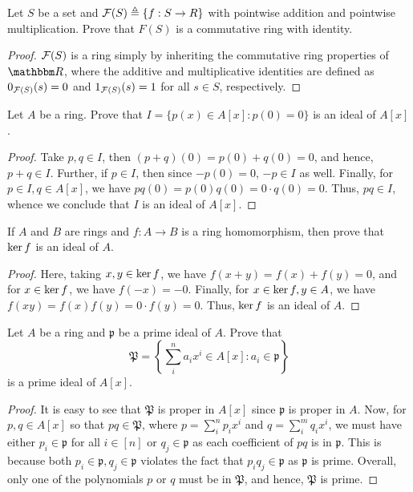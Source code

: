 \begin{exercise}
Let $S$ be a set and $\mathcal{F}(S) \triangleq \{f : S \to R\}$ with pointwise
addition and pointwise multiplication. Prove that $F(S)$ is a commutative ring with identity.
\end{exercise}
\begin{proof}
$\mathcal{F}(S)$ is a ring simply by inheriting the commutative ring properties of $\R$, where the additive and multiplicative identities are defined as $0_{\mathcal{F}(S)}(s) = 0$ and $1_{\mathcal{F}(S)}(s) = 1$ for all $s \in S$, respectively.
\end{proof}


\begin{exercise}
Let $A$ be a ring. Prove that $I = \{p(x) \in A[x] \colon p(0) = 0\}$ is an ideal of $A[x]$.
\end{exercise}
\begin{proof}
Take $p,q \in I$, then $(p+q)(0) = p(0) + q(0) = 0$, and hence, $p+q \in I$. Further, if $p \in I$, then since $-p(0) = 0$, $-p \in I$ as well. Finally, for $p \in I, q \in A[x]$, we have
$pq(0) = p(0)q(0) = 0\cdot q(0) = 0$. Thus, $pq \in I$, whence we conclude that $I$ is an ideal of $A[x]$.
\end{proof}


\begin{exercise}
If $A$ and $B$ are rings and $f : A \to B$ is a ring homomorphism, then prove
that $\operatorname{\text{ker\/}}{f}$ is an ideal of $A$.
\end{exercise}
\begin{proof}
Here, taking $x, y \in \operatorname{\text{ker\/}}{f}$, we have $f(x+y) = f(x)+f(y) = 0$, and for $x \in \operatorname{\text{ker\/}}{f}$, we have $f(-x) = - 0$. Finally, for $x \in \operatorname{\text{ker\/}}{f}, y \in A$, we have $f(xy) = f(x)f(y) = 0 \cdot f(y) = 0$. Thus, $\operatorname{\text{ker\/}}{f}$ is an ideal of $A$.
\end{proof}


\begin{exercise}
Let $A$ be a ring and $\mathfrak{p}$ be a prime ideal of $A$. Prove that
\[
\mathfrak{P} =
\left\{ \sum_i^n a_ix^i \in A[x] \colon a_i \in \mathfrak{p}
\right \}
\]
is a prime ideal of $A[x]$.
\end{exercise}
\begin{proof}
It is easy to see that $\mathfrak{P}$ is proper in $A[x]$ since $\mathfrak{p}$ is proper in $A$. Now, for ${p}, {q} \in A[x]$ so that $pq \in \mathfrak{P}$, where ${p} = \sum_i^n p_ix^i$ and ${q} = \sum_i^m q_ix^i$, we must have either $p_i \in \mathfrak{p}$ for all $i\in [n]$ or $q_j \in \mathfrak{p}$ as each coefficient of $pq$ is in $\mathfrak{p}$. This is because both $p_i \in \mathfrak{p}, q_j \in \mathfrak{p}$ violates the fact that $p_iq_j \in \mathfrak{p}$ as $\mathfrak{p}$ is prime. Overall, only one of the polynomials $p$ or $q$ must be in $\mathfrak{P}$, and hence, $\mathfrak{P}$ is prime.
\end{proof}
\newpage

